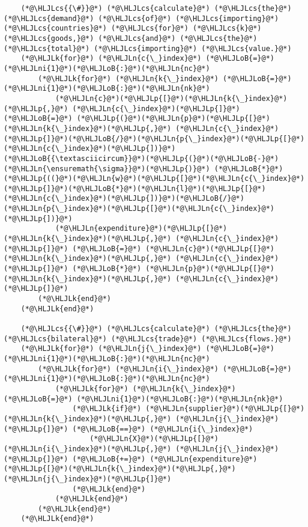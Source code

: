 \documentclass[12pt,a4paper]{article}
\newcommand{\HLJLk}[1]{\textcolor[RGB]{148,91,176}{\textbf{#1}}}
\newcommand{\HLJLn}[1]{#1}
\newcommand{\HLJLni}[1]{\textcolor[RGB]{59,151,46}{#1}}
\newcommand{\HLJLoB}[1]{\textcolor[RGB]{102,102,102}{\textbf{#1}}}
\newcommand{\HLJLp}[1]{#1}
\newcommand{\HLJLcs}[1]{\textcolor[RGB]{153,153,119}{\textit{#1}}}
\begin{document}
\begin{lstlisting}
    (*@\HLJLcs{{\#}}@*) (*@\HLJLcs{calculate}@*) (*@\HLJLcs{the}@*) (*@\HLJLcs{demand}@*) (*@\HLJLcs{of}@*) (*@\HLJLcs{importing}@*) (*@\HLJLcs{countries}@*) (*@\HLJLcs{for}@*) (*@\HLJLcs{k}@*) (*@\HLJLcs{goods,}@*) (*@\HLJLcs{and}@*) (*@\HLJLcs{the}@*) (*@\HLJLcs{total}@*) (*@\HLJLcs{importing}@*) (*@\HLJLcs{value.}@*)
    (*@\HLJLk{for}@*) (*@\HLJLn{c{\_}index}@*) (*@\HLJLoB{=}@*) (*@\HLJLni{1}@*)(*@\HLJLoB{:}@*)(*@\HLJLn{nc}@*)
        (*@\HLJLk{for}@*) (*@\HLJLn{k{\_}index}@*) (*@\HLJLoB{=}@*) (*@\HLJLni{1}@*)(*@\HLJLoB{:}@*)(*@\HLJLn{nk}@*)
            (*@\HLJLn{c}@*)(*@\HLJLp{[}@*)(*@\HLJLn{k{\_}index}@*)(*@\HLJLp{,}@*) (*@\HLJLn{c{\_}index}@*)(*@\HLJLp{]}@*) (*@\HLJLoB{=}@*) (*@\HLJLp{(}@*)(*@\HLJLn{p}@*)(*@\HLJLp{[}@*)(*@\HLJLn{k{\_}index}@*)(*@\HLJLp{,}@*) (*@\HLJLn{c{\_}index}@*)(*@\HLJLp{]}@*)(*@\HLJLoB{/}@*)(*@\HLJLn{p{\_}index}@*)(*@\HLJLp{[}@*)(*@\HLJLn{c{\_}index}@*)(*@\HLJLp{])}@*)(*@\HLJLoB{{\textasciicircum}}@*)(*@\HLJLp{(}@*)(*@\HLJLoB{-}@*)(*@\HLJLn{\ensuremath{\sigma}}@*)(*@\HLJLp{)}@*) (*@\HLJLoB{*}@*) (*@\HLJLp{((}@*)(*@\HLJLn{w}@*)(*@\HLJLp{[}@*)(*@\HLJLn{c{\_}index}@*)(*@\HLJLp{]}@*)(*@\HLJLoB{*}@*)(*@\HLJLn{l}@*)(*@\HLJLp{[}@*)(*@\HLJLn{c{\_}index}@*)(*@\HLJLp{])}@*)(*@\HLJLoB{/}@*)(*@\HLJLn{p{\_}index}@*)(*@\HLJLp{[}@*)(*@\HLJLn{c{\_}index}@*)(*@\HLJLp{])}@*)
            (*@\HLJLn{expenditure}@*)(*@\HLJLp{[}@*)(*@\HLJLn{k{\_}index}@*)(*@\HLJLp{,}@*) (*@\HLJLn{c{\_}index}@*)(*@\HLJLp{]}@*) (*@\HLJLoB{=}@*) (*@\HLJLn{c}@*)(*@\HLJLp{[}@*)(*@\HLJLn{k{\_}index}@*)(*@\HLJLp{,}@*) (*@\HLJLn{c{\_}index}@*)(*@\HLJLp{]}@*) (*@\HLJLoB{*}@*) (*@\HLJLn{p}@*)(*@\HLJLp{[}@*)(*@\HLJLn{k{\_}index}@*)(*@\HLJLp{,}@*) (*@\HLJLn{c{\_}index}@*)(*@\HLJLp{]}@*)
        (*@\HLJLk{end}@*)
    (*@\HLJLk{end}@*)

    (*@\HLJLcs{{\#}}@*) (*@\HLJLcs{calculate}@*) (*@\HLJLcs{the}@*) (*@\HLJLcs{bilateral}@*) (*@\HLJLcs{trade}@*) (*@\HLJLcs{flows.}@*)
    (*@\HLJLk{for}@*) (*@\HLJLn{j{\_}index}@*) (*@\HLJLoB{=}@*) (*@\HLJLni{1}@*)(*@\HLJLoB{:}@*)(*@\HLJLn{nc}@*)
        (*@\HLJLk{for}@*) (*@\HLJLn{i{\_}index}@*) (*@\HLJLoB{=}@*) (*@\HLJLni{1}@*)(*@\HLJLoB{:}@*)(*@\HLJLn{nc}@*)
            (*@\HLJLk{for}@*) (*@\HLJLn{k{\_}index}@*) (*@\HLJLoB{=}@*) (*@\HLJLni{1}@*)(*@\HLJLoB{:}@*)(*@\HLJLn{nk}@*)
                (*@\HLJLk{if}@*) (*@\HLJLn{supplier}@*)(*@\HLJLp{[}@*)(*@\HLJLn{k{\_}index}@*)(*@\HLJLp{,}@*) (*@\HLJLn{j{\_}index}@*)(*@\HLJLp{]}@*) (*@\HLJLoB{==}@*) (*@\HLJLn{i{\_}index}@*)
                    (*@\HLJLn{X}@*)(*@\HLJLp{[}@*)(*@\HLJLn{i{\_}index}@*)(*@\HLJLp{,}@*) (*@\HLJLn{j{\_}index}@*)(*@\HLJLp{]}@*) (*@\HLJLoB{+=}@*) (*@\HLJLn{expenditure}@*)(*@\HLJLp{[}@*)(*@\HLJLn{k{\_}index}@*)(*@\HLJLp{,}@*) (*@\HLJLn{j{\_}index}@*)(*@\HLJLp{]}@*)
                (*@\HLJLk{end}@*)
            (*@\HLJLk{end}@*)
        (*@\HLJLk{end}@*)
    (*@\HLJLk{end}@*)


\end{lstlisting}
\end{document}
